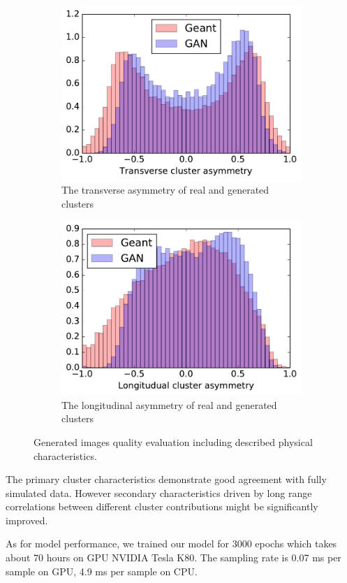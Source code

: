 \begin{figure}
\begin{subfigure}[t]{0.35\textwidth}
    \includegraphics[width=1\textwidth]{figures/transverseAsymmetry.pdf}
    \caption{The transverse asymmetry of real and generated clusters}
  \end{subfigure}\hspace{0.2\textwidth}
  \begin{subfigure}[t]{0.35\textwidth}
    \centering
    \includegraphics[width=1\textwidth]{figures/longAsymmetry.pdf}
    \caption{The longitudinal asymmetry of real and generated clusters}
  \end{subfigure}
  \caption{Generated images quality evaluation including described physical characteristics.}\label{fig:quality}  
\end{figure}

The primary cluster characteristics  demonstrate good agreement with
fully simulated data. However secondary characteristics driven by
long range correlations between different cluster contributions might
be significantly improved.  




As for model performance, we trained our model for 3000 epochs which takes about 70 hours on GPU NVIDIA Tesla K80. The sampling rate is 0.07 ms per sample on GPU, 4.9 ms per sample on CPU.
